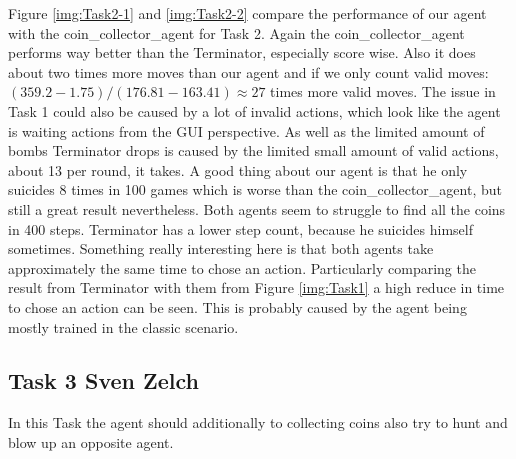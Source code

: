 \documentclass[
	letterpaper, %
	12pt, %
]{CSUniSchoolLabReport}
\begin{document}
Figure \ref{img:Task2-1} and \ref{img:Task2-2} compare the performance of our agent with the coin\_collector\_agent for Task 2.
Again the coin\_collector\_agent performs way better than the Terminator, especially score wise. 
Also it does about two times more moves than our agent and if we only count valid moves:
$(359.2- 1.75) / (176.81 - 163.41) \approx 27$
times more valid moves.
The issue in Task 1 could also be caused by a lot of invalid actions, which look like the agent is waiting actions from the GUI perspective.
As well as the limited amount of bombs Terminator drops is caused by the limited small amount of valid actions, about 13 per round, it takes.
A good thing about our agent is that he only suicides 8 times in 100 games which is worse than the coin\_collector\_agent, but still a great result nevertheless.
Both agents seem to struggle to find all the coins in 400 steps. 
Terminator has a lower step count, because he suicides himself sometimes.
Something really interesting here is that both agents take approximately the same time to chose an action.
Particularly comparing the result from Terminator with them from Figure \ref{img:Task1} a high reduce in time to chose an action can be seen.
This is probably caused by the agent being mostly trained in the classic scenario.

\subsection{Task 3 \tiny Sven Zelch}

In this Task the agent should additionally to collecting coins also try to hunt and blow up an opposite agent.
\end{document}

